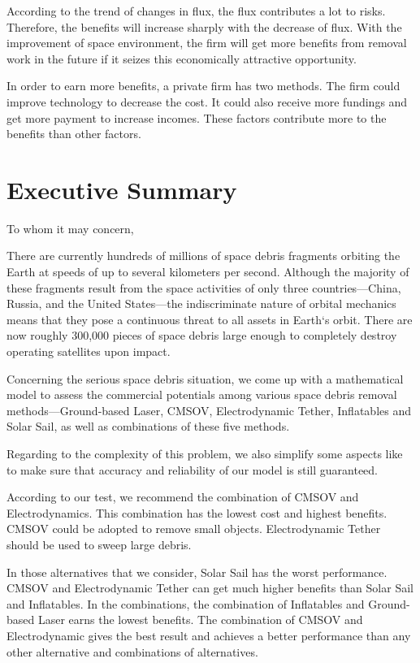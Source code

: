 \documentclass{mcmthesis}
\begin{document}
	According to the trend of changes in flux, the flux contributes a lot to risks. Therefore, the benefits will increase sharply with the decrease of flux. With the improvement of space environment, the firm will get more benefits from removal work in the future if it seizes this economically attractive opportunity.
	
	In order to earn more benefits, a private firm has two methods. The firm could improve technology to decrease the cost. It could also receive more fundings and get more payment to increase incomes. These factors contribute more to the benefits than other factors.


	
	
	
\newpage
\section*{Executive Summary}
	
\noindent To whom it may concern,
	
	There are currently hundreds of millions of space debris fragments orbiting	the Earth at speeds of up to several kilometers per second. Although the	majority of these fragments result from the space activities of only three countries---China, Russia, and the United States---the indiscriminate nature of orbital mechanics means that they pose a continuous threat to all assets in Earth`s orbit. There are now roughly 300,000 pieces of space	debris large enough to completely destroy operating satellites upon impact.
	
	Concerning the serious space debris situation, we come up with a mathematical model to assess the commercial potentials among various space debris removal methods---Ground-based Laser, CMSOV, Electrodynamic Tether, Inflatables and Solar Sail, as well as combinations of these five methods.
	
	Regarding to the complexity of this problem, we also simplify some aspects like  to make sure that accuracy and reliability of our model is still guaranteed.
	
	According to our test, we recommend the combination of CMSOV and Electrodynamics. This combination has the lowest cost and highest benefits. CMSOV could be adopted to remove small objects. Electrodynamic Tether should be used to sweep large debris.
	
	In those alternatives that we consider, Solar Sail has the worst performance. CMSOV and Electrodynamic Tether can get much higher benefits than Solar Sail and Inflatables. In the combinations, the combination of Inflatables and Ground-based Laser earns the lowest benefits. The combination of CMSOV and Electrodynamic gives the best result and achieves a better performance than any other alternative and combinations of alternatives.
\end{document}
